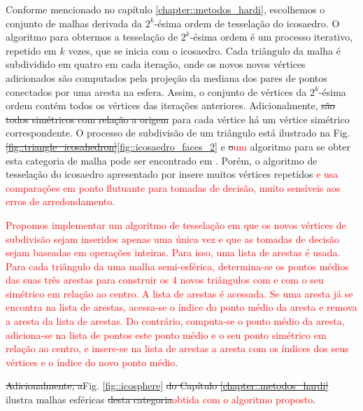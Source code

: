 Conforme mencionado no capítulo \ref{chapter::metodos_hardi}, escolhemos o conjunto de malhas derivada da $2^k$-ésima ordem de tesselação do icosaedro. O algoritmo para obtermos a tesselação de $2^k$-ésima ordem é um processo iterativo, repetido em $k$ vezes, que se inicia com o icosaedro. Cada triângulo da malha é subdividido em quatro em cada iteração, onde os novos novos vértices adicionados são computados pela projeção da mediana dos pares de pontos conectados por uma aresta na esfera. Assim, o conjunto de vértices da $2^k$-ésima ordem contém todos os vértices das iterações anteriores. Adicionalmente, \sout{são todos simétricos com relação a origem} para cada vértice há um vértice simétrico correspondente. O processo de subdivisão de um triângulo está ilustrado na Fig. \sout{\ref{fig::triangle_icosahedron}}\ref{fig::icosaedro_faces_2} e \sout{o}\textcolor{red}{um} algoritmo para se obter esta categoria de malha pode ser encontrado em . Porém, o algoritmo de tesselação do icosaedro apresentado por  insere muitos vértices repetidos \textcolor{red}{e usa comparações em ponto flutuante para tomadas de decisão, muito sensíveis aos erros de arredondamento.}

\textcolor{red}{Propomos implementar um algoritmo de tesselação em que os novos vértices de subdivisão sejam inseridos apenas uma única vez e que as tomadas de decisão sejam baseadas em operações inteiras. Para isso, uma lista de arestas é usada. Para cada triângulo da uma malha semi-esférica, determina-se os pontos médios das suas três arestas para construir os 4 novos triângulos com e com o seu simétrico em relação ao centro. A lista de arestas é acessada. Se uma aresta já se encontra na lista de arestas, acessa-se o índice do ponto médio da aresta e remova a aresta da lista de arestas. Do contrário, computa-se o ponto médio da aresta, adiciona-se na lista de pontos este ponto médio e o seu ponto simétrico em relação ao centro, e insere-se na lista de arestas a aresta com os índices dos seus vértices e o índice do novo ponto médio.}

\sout{Adicionalmente, a}Fig. \ref{fig::icosphere} \sout{do Capítulo \ref{chapter::metodos_hardi}} ilustra malhas esféricas \sout{desta categoria}\textcolor{red}{obtida com o algoritmo proposto}.


